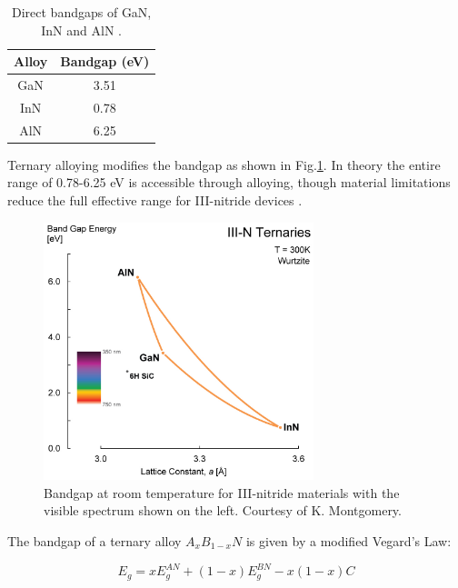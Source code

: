 \begin{table}[!htb]
	\centering
	\begin{tabular}{cc}
		Alloy & Bandgap (eV) \\
		\hline\hline
		GaN   & 3.51 \\
		InN   & 0.78 \\
		AlN   & 6.25  \\ 
		\hline
	\end{tabular}
	\caption{Direct bandgaps of GaN, InN and AlN \cite{Vurgaftman2003}.}
	\label{tab1.2}
\end{table}

Ternary alloying modifies the bandgap as shown in Fig.\ref{bgap}. In theory the entire range of 0.78-6.25 eV is accessible through alloying, though material limitations reduce the full effective range for III-nitride devices \cite{Scholz2012}.

\begin{figure}[h]
	\centering
	\includegraphics[width=0.7\textwidth]{Figs/Ch1/III-N-Ternaries-update.jpg}
	\caption {Bandgap at room temperature for III-nitride materials with the visible spectrum shown on the left. Courtesy of K. Montgomery.}
	\label{bgap}
\end{figure}
\FloatBarrier

The bandgap of a ternary alloy $A_{x}B_{1-x}N$ is given by a modified Vegard's Law:

\begin{equation}
E_{g} = x E_{g}^{AN} + (1-x)E_{g}^{BN}-x(1-x)C
\end{equation}

